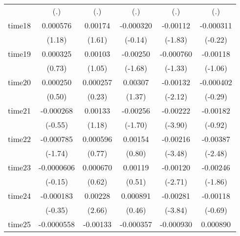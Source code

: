 \begin{table}[htbp]
\begin{tabular}{l*{5}{c}}
            &         (.)         &         (.)         &         (.)         &         (.)         &         (.)         \\
time18      &    0.000576         &     0.00174         &   -0.000320         &    -0.00112         &   -0.000311         \\
            &      (1.18)         &      (1.61)         &     (-0.14)         &     (-1.83)         &     (-0.22)         \\
time19      &    0.000325         &     0.00103         &    -0.00250         &   -0.000760         &    -0.00118         \\
            &      (0.73)         &      (1.05)         &     (-1.68)         &     (-1.33)         &     (-1.06)         \\
time20      &    0.000250         &    0.000257         &     0.00307         &    -0.00132\sym{*}  &   -0.000402         \\
            &      (0.50)         &      (0.23)         &      (1.37)         &     (-2.12)         &     (-0.29)         \\
time21      &   -0.000268         &     0.00133         &    -0.00256         &    -0.00222\sym{***}&    -0.00182         \\
            &     (-0.55)         &      (1.18)         &     (-1.70)         &     (-3.90)         &     (-0.92)         \\
time22      &   -0.000785         &    0.000596         &     0.00154         &    -0.00216\sym{***}&    -0.00387\sym{*}  \\
            &     (-1.74)         &      (0.77)         &      (0.80)         &     (-3.48)         &     (-2.48)         \\
time23      &  -0.0000606         &    0.000670         &     0.00119         &    -0.00120\sym{**} &    -0.00246         \\
            &     (-0.15)         &      (0.62)         &      (0.51)         &     (-2.71)         &     (-1.86)         \\
time24      &   -0.000183         &     0.00228\sym{**} &    0.000891         &    -0.00281\sym{***}&    -0.00118         \\
            &     (-0.35)         &      (2.66)         &      (0.46)         &     (-3.84)         &     (-0.69)         \\
time25      &  -0.0000558         &    -0.00133         &   -0.000357         &   -0.000930         &    0.000890         \\

\end{tabular}
\end{table}
